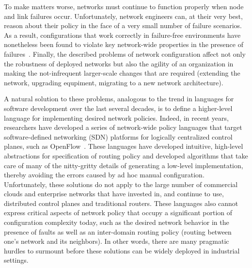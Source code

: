 To make matters worse, networks must continue to function properly when node and link failures occur.  
Unfortunately, network engineers
can, at their very best, reason about their policy in the face of a very small number of failure 
scenarios.  As a result, configurations that work
correctly in failure-free environments have nonetheless been found to violate key
network-wide properties in the presence of failures~\cite{batfish}.
Finally, the described problems of network configuration affect not only the robustness of deployed networks but also the agility of an organization in making the not-infrequent larger-scale changes that are required (extending the network, upgrading equpiment, migrating to a new network architecture).

A natural solution to these problems, analogous to the trend in languages for software development over the last several decades, is to define a higher-level language for implementing desired network policies.  
Indeed, in recent years, researchers have developed a series of network-wide policy 
languages that target  software-defined networking (SDN) platforms for logically centralized control planes, such as OpenFlow~\cite{frenetic,flowlog,foster:merlin,vericon,sagiv:l,fattire,netkat,kinetic,sdn-languages}. These languages have developed intuitive, high-level abstractions for specification
of routing policy and developed algorithms that take care of many of the nitty-gritty details of
generating a low-level implementation, thereby avoiding the errors caused by
ad hoc manual configuration.
Unfortunately, these solutions do not apply to the large number of commercial clouds and 
enterprise networks that have invested in, and continue to use, distributed control planes and 
traditional routers.  These languages also cannot express critical aspects of network policy that occupy a significant portion of configuration complexity today, such as the desired network behavior in the presence of faults as well as an inter-domain routing policy (routing between one's network and its neighbors).  In other words, there are many pragmatic hurdles to surmount before
these solutions can be widely deployed in industrial settings.


